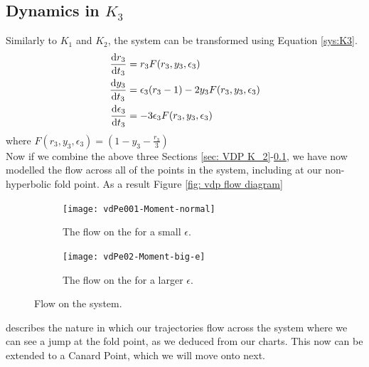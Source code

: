 \subsection{Dynamics in \texorpdfstring{$K_3$}{K3}}\label{sec:dynamics-in-texorpdfstringk3k3}
Similarly to $K_1$ and $K_2$, the system can be transformed using Equation \ref{sys:K3}.
\begin{align*}
\od{r_3}{t_3}&=r_3F(r_3,y_3,\epsilon_3)\\
\od{y_3}{t_3}&=\epsilon_3(r_3-1)-2y_3F(r_3,y_3,\epsilon_3)\\
\od{\epsilon_3}{t_3}&=-3\epsilon_3F(r_3,y_3,\epsilon_3)
\end{align*}
where $F(r_3,y_3,\epsilon_3)=\left(1-y_3-\frac{r_3}{3}\right)$ \\
 

Now if we combine the above three Sections \ref{sec: VDP K_2}-\ref{sec:dynamics-in-texorpdfstringk3k3}, we have now modelled the flow across all of the points in the \vdp system, including at our non-hyperbolic fold point. As a result Figure \ref{fig: vdp flow diagram}
\begin{figure}[h!]\centering
		\begin{subfigure}[t]{0.45\textwidth}
			\centering
			\texttt{[image: vdPe001-Moment-normal]}
			\caption{The flow on the \vdp for a small $ \epsilon $.} \label{fig: vdp normal}
		\end{subfigure}
		\hfill
		\begin{subfigure}[t]{0.45\textwidth}
			\centering
			\texttt{[image: vdPe02-Moment-big-e]}
			\caption{The flow on the \vdp for a larger $ \epsilon $.} \label{fig: vdp big e}
		\end{subfigure}
		
	\caption{Flow on the \vdp system.}
	\label{\ref{fig: vdp flow diagram}}
\end{figure}\newpage
describes the nature in which our trajectories flow across the system where we can see a jump at the fold point, as we deduced from our charts. This now can be extended to a Canard Point, which we will move onto next. 
\newpage